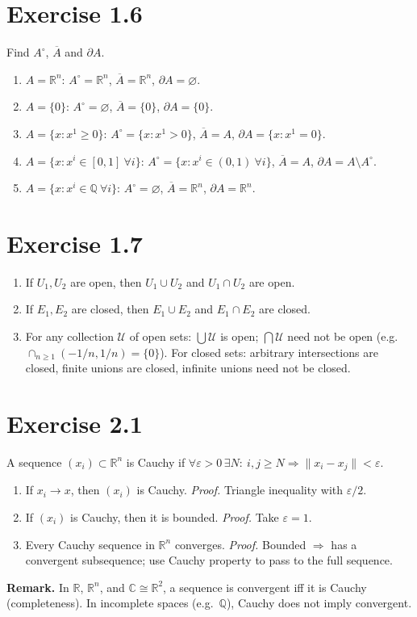 \documentclass[11pt,a4paper]{article}
\begin{document}
\section*{Exercise 1.6}
Find $A^\circ$, $\overline{A}$ and $\partial A$.
\begin{enumerate}
\renewcommand\labelenumi{(\alph{enumi})}
\item $A=\mathbb{R}^n$: $A^\circ=\mathbb{R}^n$, $\overline{A}=\mathbb{R}^n$, $\partial A=\varnothing$.
\item $A=\{0\}$: $A^\circ=\varnothing$, $\overline{A}=\{0\}$, $\partial A=\{0\}$.
\item $A=\{x:x^1\ge 0\}$: $A^\circ=\{x:x^1>0\}$, $\overline{A}=A$, $\partial A=\{x:x^1=0\}$.
\item $A=\{x:x^i\in[0,1]\ \forall i\}$: $A^\circ=\{x:x^i\in(0,1)\ \forall i\}$, $\overline{A}=A$, $\partial A=A\setminus A^\circ$.
\item $A=\{x:x^i\in\mathbb{Q}\ \forall i\}$: $A^\circ=\varnothing$, $\overline{A}=\mathbb{R}^n$, $\partial A=\mathbb{R}^n$.
\end{enumerate}

\section*{Exercise 1.7}
\begin{enumerate}
\renewcommand\labelenumi{(\alph{enumi})}
\item If $U_1,U_2$ are open, then $U_1\cup U_2$ and $U_1\cap U_2$ are open.
\item If $E_1,E_2$ are closed, then $E_1\cup E_2$ and $E_1\cap E_2$ are closed.
\item For any collection $\mathcal U$ of open sets: $\bigcup\mathcal U$ is open; $\bigcap\mathcal U$ need not be open (e.g.\ $\cap_{n\ge1}(-1/n,1/n)=\{0\}$).
For closed sets: arbitrary intersections are closed, finite unions are closed, infinite unions need not be closed.
\end{enumerate}

\section*{Exercise 2.1}
A sequence $(x_i)\subset\mathbb{R}^n$ is Cauchy if $\forall\varepsilon>0\,\exists N:\ i,j\ge N\Rightarrow \|x_i-x_j\|<\varepsilon$.
\begin{enumerate}
\renewcommand\labelenumi{(\alph{enumi})}
\item If $x_i\to x$, then $(x_i)$ is Cauchy. \textit{Proof.} Triangle inequality with $\varepsilon/2$.
\item If $(x_i)$ is Cauchy, then it is bounded. \textit{Proof.} Take $\varepsilon=1$.
\item Every Cauchy sequence in $\mathbb{R}^n$ converges. \textit{Proof.} Bounded $\Rightarrow$ has a convergent subsequence; use Cauchy property to pass to the full sequence.
\end{enumerate}
\textbf{Remark.} In $\mathbb{R}$, $\mathbb{R}^n$, and $\mathbb{C}\cong\mathbb{R}^2$, a sequence is convergent iff it is Cauchy (completeness). In incomplete spaces (e.g.\ $\mathbb{Q}$), Cauchy does not imply convergent.
\end{document}
